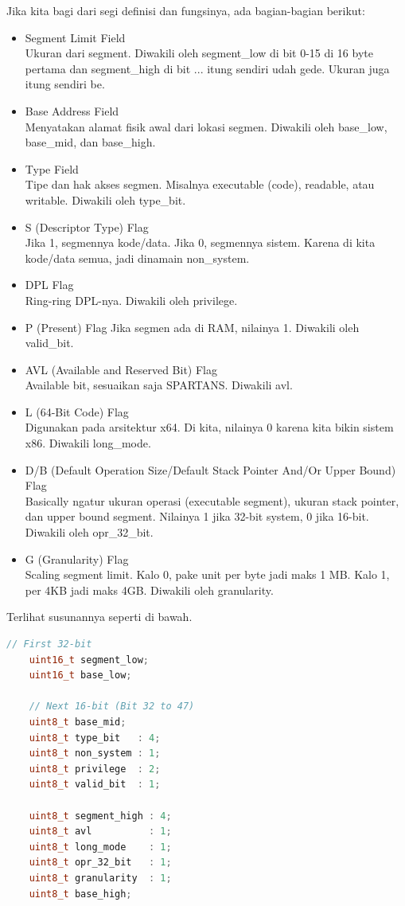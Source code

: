 Jika kita bagi dari segi definisi dan fungsinya, ada bagian-bagian berikut:
\begin{itemize}
\item Segment Limit Field \\
Ukuran dari segment. Diwakili oleh segment\_low di bit 0-15 di 16 byte pertama dan segment\_high di bit ... itung sendiri udah gede. Ukuran juga itung sendiri be.
\item Base Address Field \\
Menyatakan alamat fisik awal dari lokasi segmen. Diwakili oleh base\_low, base\_mid, dan base\_high.
\item Type Field \\
Tipe dan hak akses segmen. Misalnya executable (code), readable, atau writable. Diwakili oleh type\_bit.
\item S (Descriptor Type) Flag \\
Jika 1, segmennya kode/data. Jika 0, segmennya sistem. Karena di kita kode/data semua, jadi dinamain non\_system.
\item DPL Flag \\
Ring-ring DPL-nya. Diwakili oleh privilege.
\item P (Present) Flag
Jika segmen ada di RAM, nilainya 1. Diwakili oleh valid\_bit.
\item AVL (Available and Reserved Bit) Flag \\
Available bit, sesuaikan saja SPARTANS. Diwakili avl.
\item L (64-Bit Code) Flag \\
Digunakan pada arsitektur x64. Di kita, nilainya 0 karena kita bikin sistem x86. Diwakili long\_mode.
\item D/B (Default Operation Size/Default Stack Pointer And/Or Upper Bound) Flag \\
Basically ngatur ukuran operasi (executable segment), ukuran stack pointer, dan upper bound segment.
Nilainya 1 jika 32-bit system, 0 jika 16-bit. Diwakili oleh opr\_32\_bit.
\item G (Granularity) Flag \\
Scaling segment limit. Kalo 0, pake unit per byte jadi maks 1 MB. Kalo 1, per 4KB jadi maks 4GB. Diwakili oleh granularity.
\end{itemize}

Terlihat susunannya seperti di bawah.
\begin{lstlisting}[language=c]
    // First 32-bit
    uint16_t segment_low;
    uint16_t base_low;

    // Next 16-bit (Bit 32 to 47)
    uint8_t base_mid;
    uint8_t type_bit   : 4;
    uint8_t non_system : 1; 
    uint8_t privilege  : 2;
    uint8_t valid_bit  : 1;

    uint8_t segment_high : 4;
    uint8_t avl          : 1;
    uint8_t long_mode    : 1;
    uint8_t opr_32_bit   : 1;
    uint8_t granularity  : 1;
    uint8_t base_high;
\end{lstlisting}

